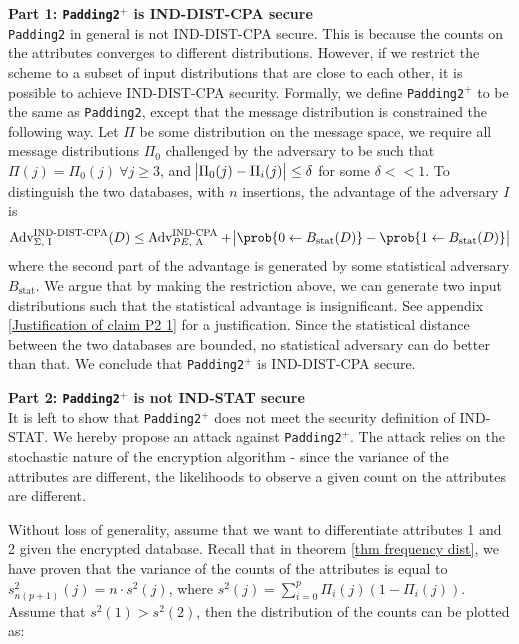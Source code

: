 \textbf{Part 1: \texttt{Padding2}$^{+}$ is IND-DIST-CPA secure} \\
\texttt{Padding2} in general is not IND-DIST-CPA secure. This is because the counts on the attributes converges to different distributions. However, if we restrict the scheme to a subset of input distributions that are close to each other, it is possible to achieve IND-DIST-CPA security. Formally, we define \texttt{Padding2$^+$} to be the same as \texttt{Padding2}, except that the message distribution is constrained the following way. Let $\Pi$ be some distribution on the message space, we require all message distributions $\Pi_0$ challenged by the adversary to be such that $\Pi(j) = \Pi_0(j) \ \forall j \geq 3$, and $\abs{\Pi_0(j) - \Pi_i(j)} \leq \delta$ for some $\delta << 1$. To distinguish the two databases, with $n$ insertions, the advantage of the adversary $I$ is
\begin{equation}
	\text{Adv}_{\text{$\Sigma$, I}}^{\text{IND-DIST-CPA}}(D) \leq \text{Adv}_{\text{$PE$, A}}^{\text{IND-CPA}} + \abs{\prob{0 \leftarrow B_{\text{stat}}(D)} - \prob{1 \leftarrow B_{\text{stat}}(D)}}
\end{equation}
where the second part of the advantage is generated by some statistical adversary $B_\text{stat}$. We argue that by making the restriction above, we can generate two input distributions such that the statistical advantage is insignificant. See appendix \ref{Justification of claim P2 1} for a justification. Since the statistical distance between the two databases are bounded, no statistical adversary can do better than that. We conclude that \texttt{Padding2$^+$} is IND-DIST-CPA secure.


\textbf{Part 2: \texttt{Padding2}$^{+}$ is not IND-STAT secure} \\
It is left to show that \texttt{Padding2}$^{+}$ does not meet the security definition of IND-STAT. We hereby propose an attack against \texttt{Padding2}$^{+}$. The attack relies on the stochastic nature of the encryption algorithm - since the variance of the attributes are different, the likelihoods to observe a given count on the attributes are different.

Without loss of generality, assume that we want to differentiate attributes 1 and 2 given the encrypted database. Recall that in theorem \ref{thm frequency dist}, we have proven that the variance of the counts of the attributes is equal to $s_{n(p+1)}^2(j) = n \cdot s^2(j)$, where $s^2(j) = \sum_{i= 0}^{p} \Pi_i(j) (1 - \Pi_i(j))$. Assume that $s^2(1) > s^2(2)$, then the distribution of the counts can be plotted as:

